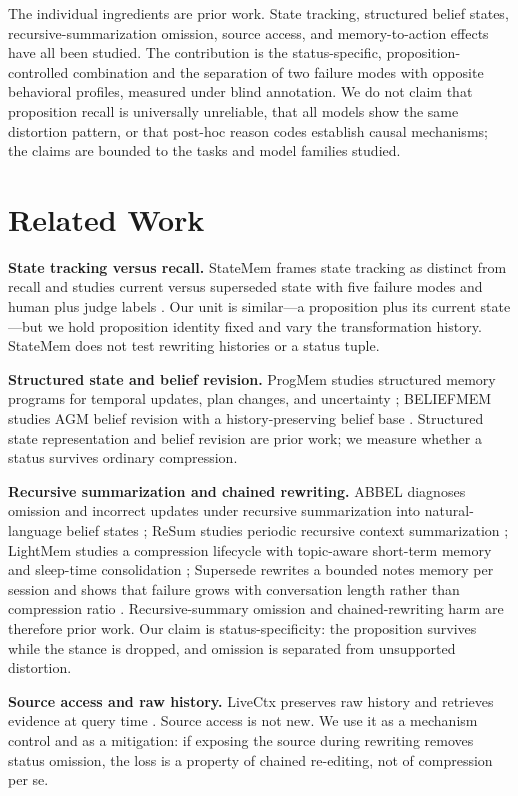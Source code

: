 \documentclass{ecai}
\begin{document}
The individual ingredients are prior work. State tracking, structured belief
states, recursive-summarization omission, source access, and memory-to-action
effects have all been studied. The contribution is the status-specific,
proposition-controlled combination and the separation of two failure modes with
opposite behavioral profiles, measured under blind annotation. We do not
claim that proposition recall is universally unreliable, that all models show
the same distortion pattern, or that post-hoc reason codes establish causal
mechanisms; the claims are bounded to the tasks and model families studied.

\section{Related Work}

\textbf{State tracking versus recall.} StateMem frames state tracking as distinct
from recall and studies current versus superseded state with five failure modes
and human plus judge labels \citep{statemen}. Our unit is similar---a proposition
plus its current state---but we hold proposition identity fixed and vary the
transformation history. StateMem does not test rewriting histories or a status
tuple.

\textbf{Structured state and belief revision.} ProgMem studies structured memory
programs for temporal updates, plan changes, and uncertainty \citep{progmem};
BELIEFMEM studies AGM belief revision with a history-preserving belief base
\citep{beliefmem}. Structured state representation and belief revision are prior
work; we measure whether a status survives ordinary compression.

\textbf{Recursive summarization and chained rewriting.} ABBEL diagnoses omission
and incorrect updates under recursive summarization into natural-language belief
states \citep{abbel}; ReSum studies periodic recursive context summarization
\citep{resum}; LightMem studies a compression lifecycle with topic-aware
short-term memory and sleep-time consolidation \citep{lightmem}; Supersede
rewrites a bounded notes memory per session and shows that failure grows with
conversation length rather than compression ratio \citep{supersede}.
Recursive-summary omission and chained-rewriting harm are therefore prior work.
Our claim is status-specificity: the proposition survives while the stance is
dropped, and omission is separated from unsupported distortion.

\textbf{Source access and raw history.} LiveCtx preserves raw history and
retrieves evidence at query time \citep{livectx}. Source access is not new. We
use it as a mechanism control and as a mitigation: if exposing the source during
rewriting removes status omission, the loss is a property of chained re-editing,
not of compression per se.
\end{document}
